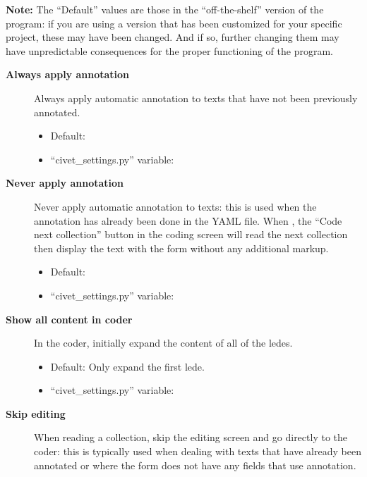 \documentclass[letterpaper,10pt,english]{sphinxmanual}
\begin{document}
\textbf{Note:} The “Default” values are those in the “off-the-shelf” version of the
program: if you are using a version that has been customized for your specific
project, these may have been changed. And if so, further changing them may have
unpredictable consequences for the proper functioning of the program.
\begin{description}
\item[{\textbf{Always apply annotation}}] \leavevmode
Always apply automatic annotation to texts that have not been previously
annotated.
\begin{itemize}
\item {} 
Default: 

\item {} 
“civet\_settings.py” variable: 

\end{itemize}

\item[{\textbf{Never apply annotation}}] \leavevmode
Never apply automatic annotation to texts: this is used when the annotation has
already been done in the YAML file. When ,  the
“Code next collection” button in the coding screen will read the next
collection then display the text with the form without any additional
markup.
\begin{itemize}
\item {} 
Default: 

\item {} 
“civet\_settings.py” variable: 

\end{itemize}

\item[{\textbf{Show all content in coder}}] \leavevmode
In the coder, initially expand the content of all of the ledes.
\begin{itemize}
\item {} 
Default: Only expand the first lede.

\item {} 
“civet\_settings.py” variable: 

\end{itemize}

\item[{\textbf{Skip editing}}] \leavevmode
When reading a collection, skip the editing screen and go directly to the
coder: this is typically used when dealing with texts that have already
been annotated or where the form does not have any fields that use
annotation.


\end{description}
\end{document}

